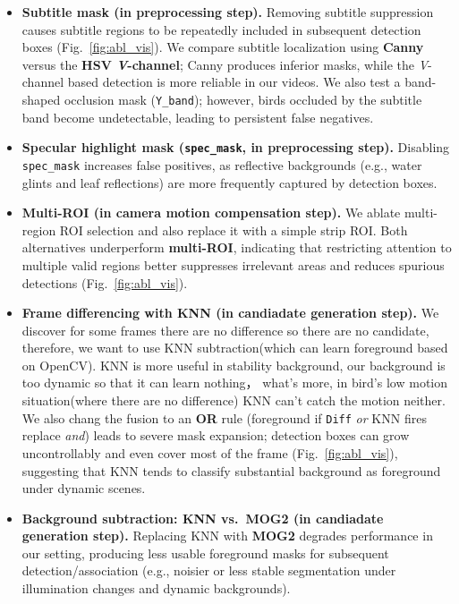 \begin{itemize}
    \item \textbf{Subtitle mask (in preprocessing step).} Removing subtitle suppression causes subtitle regions to be repeatedly included in subsequent detection boxes (Fig.~\ref{fig:abl_vis}). We compare subtitle localization using \textbf{Canny} versus the \textbf{HSV \emph{V}-channel}; Canny produces inferior masks, while the \emph{V}-channel based detection is more reliable in our videos. We also test a band-shaped occlusion mask (\texttt{Y\_band}); however, birds occluded by the subtitle band become undetectable, leading to persistent false negatives.

    \item \textbf{Specular highlight mask (\texttt{spec\_mask}, in preprocessing step).} Disabling \texttt{spec\_mask} increases false positives, as reflective backgrounds (e.g., water glints and leaf reflections) are more frequently captured by detection boxes.

    \item \textbf{Multi-ROI (in camera motion compensation step).} We ablate multi-region ROI selection and also replace it with a simple strip ROI. Both alternatives underperform \textbf{multi-ROI}, indicating that restricting attention to multiple valid regions better suppresses irrelevant areas and reduces spurious detections (Fig.~\ref{fig:abl_vis}).

    \item \textbf{Frame differencing with KNN (in candiadate generation step).} We discover for some frames there are no difference so there are no candidate, therefore, we want to use KNN subtraction(which can learn foreground based on OpenCV). KNN is more useful in stability background, our background is too dynamic so that it can learn nothing， what's more, in bird's low motion situation(where there are no difference) KNN can't catch the motion neither. We also chang the fusion to an \textbf{OR} rule (foreground if \texttt{Diff} \emph{or} KNN fires replace \emph{and}) leads to severe mask expansion; detection boxes can grow uncontrollably and even cover most of the frame (Fig.~\ref{fig:abl_vis}), suggesting that KNN tends to classify substantial background as foreground under dynamic scenes.

    \item \textbf{Background subtraction: KNN vs.\ MOG2 (in candiadate generation step).} Replacing KNN with \textbf{MOG2} degrades performance in our setting, producing less usable foreground masks for subsequent detection/association (e.g., noisier or less stable segmentation under illumination changes and dynamic backgrounds).
\end{itemize}




